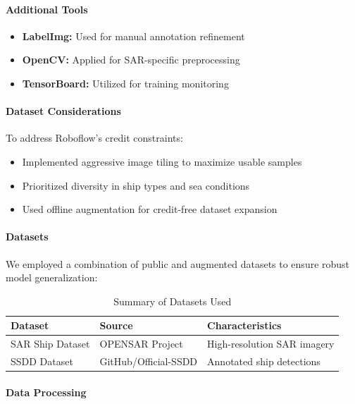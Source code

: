 \documentclass{article}
\begin{document}
	\paragraph{Additional Tools}
	\begin{itemize}
		\item \textbf{LabelImg:} Used for manual annotation refinement
		\item \textbf{OpenCV:} Applied for SAR-specific preprocessing
		\item \textbf{TensorBoard:} Utilized for training monitoring
	\end{itemize}
	
	\paragraph{Dataset Considerations}
	To address Roboflow's credit constraints:
	\begin{itemize}
		\item Implemented aggressive image tiling to maximize usable samples
		\item Prioritized diversity in ship types and sea conditions
		\item Used offline augmentation for credit-free dataset expansion
	\end{itemize}
	
	\paragraph{Datasets}
	
	We employed a combination of public and augmented datasets to ensure robust model generalization:
	
	\begin{table}[h!]
		\centering
		\begin{tabular}{|l|l|l|}
			\hline
			\textbf{Dataset} & \textbf{Source} & \textbf{Characteristics} \\
			\hline
			SAR Ship Dataset & OPENSAR Project & High-resolution SAR imagery \\
			SSDD Dataset     & GitHub/Official-SSDD & Annotated ship detections \\
			\hline
		\end{tabular}
		\caption{Summary of Datasets Used}
	\end{table}
	
	\paragraph{Data Processing}
	
\end{document}
